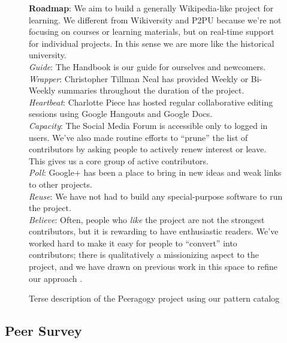 \documentclass{acm_proc_article-sp}
\newenvironment{cframed}[1][blue]
  {\def\FrameCommand{\fboxsep=\FrameSep\fcolorbox{#1}{white}}%
    \MakeFramed {\advance\hsize-\width \FrameRestore}}
  {\endMakeFramed}
\begin{document}
\begin{figure}[h]
\begin{cframed}[black]
{\bf Roadmap}: We aim to build a generally Wikipedia-like project for
learning.  We different from Wikiversity and P2PU because we're not
focusing on courses or learning materials, but on real-time support
for individual projects.  In this sense we are more like the
historical university. \\

\emph{Guide}: The Handbook is our guide for ourselves and newcomers. \\

\emph{Wrapper}: Christopher Tillman Neal has provided Weekly or
Bi-Weekly summaries throughout the duration of the project. \\

\emph{Heartbeat}: Charlotte Piece has hosted regular collaborative
editing sessions using Google Hangouts and Google Docs. \\

\emph{Capacity}: The Social Media Forum is accessible only to logged in
users.  We've also made routine efforts to ``prune'' the list of
contributors by asking people to actively renew interest or leave.
This gives us a core group of active contributors. \\

\emph{Poll}: Google+ has been a place to bring in new ideas and weak
links to other projects. \\

\emph{Reuse}: We have not had to build any special-purpose software to
run the project.  \\

\emph{Believe}: Often, people who \emph{like} the project are not the
strongest contributors, but it is rewarding to have enthusiastic
readers.  We've worked hard to make it easy for people to ``convert''
into contributors; there is qualitatively a missionizing aspect to the
project, and we have drawn on previous work in this space to refine
our approach \cite{Bridges}. 
\end{cframed}
\vspace{-.2in}
\caption{Terse description of the Peeragogy project using our pattern catalog}
\end{figure}

\subsection{Peer Survey}
\end{document}
